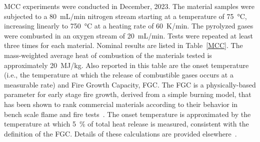 MCC experiments were conducted in December, 2023. The material samples were subjected to a 80~mL/min nitrogen stream starting at a temperature of 75~°C, increasing linearly to 750~°C at a heating rate of 60~K/min. The pyrolyzed gases were combusted in an oxygen stream of 20~mL/min. Tests were repeated at least three times for each material. Nominal results are listed in Table~\ref{MCC}. The mass-weighted average heat of combustion of the materials tested is approximately 20~MJ/kg. Also reported in this table are the onset temperature (i.e., the temperature at which the release of combustible gases occurs at a measurable rate) and Fire Growth Capacity, FGC. The FGC is a physically-based parameter for early stage fire growth, derived from a simple burning model, that has been shown to rank commercial materials according to their behavior in bench scale flame and fire tests~\cite{lyon2021molecular}. The onset temperature is approximated by the temperature at which 5~\% of total heat release is measured, consistent with the definition of the FGC. Details of these calculations are provided elsewhere~\cite{DOT/FAA/TC-20/30, lyon2021molecular}.



